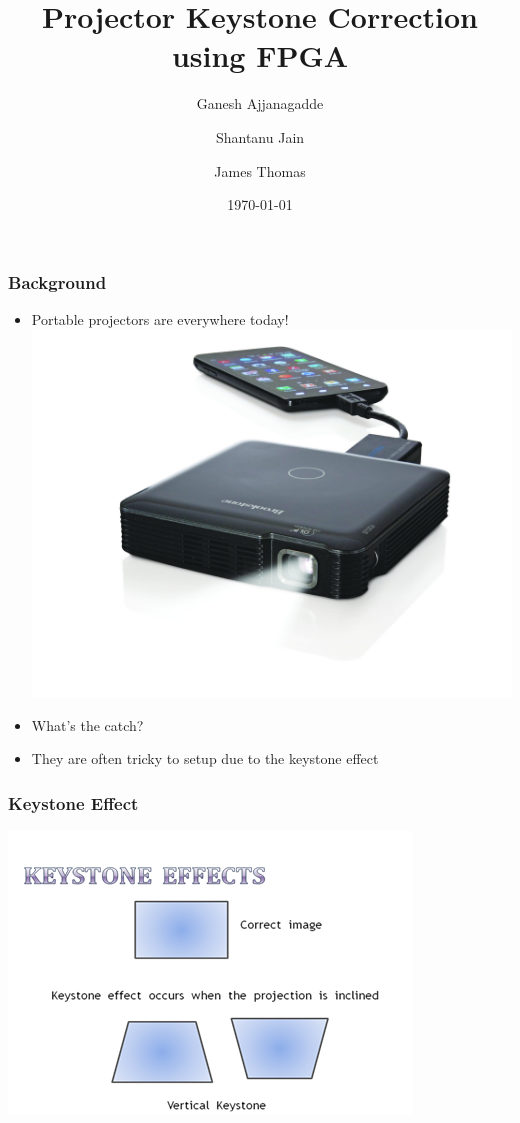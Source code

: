 \documentclass{beamer}
\title{Projector Keystone Correction using FPGA }
\author{Ganesh Ajjanagadde \and Shantanu Jain \and James Thomas}
\date{\today}
\begin{document}
\maketitle

\begin{frame}
\frametitle{Background}
\begin{itemize}
\item Portable projectors are everywhere today!
\includegraphics[height=0.6\textheight]{./img/digital_projector}
\item What's the catch?
\pause
\item They are often tricky to setup due to the keystone effect
\end{itemize}
\end{frame}

\begin{frame}
\frametitle{Keystone Effect}
\includegraphics[height=0.8\textheight]{./img/keystone_effect}
\end{frame}
\end{document}
